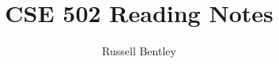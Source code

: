 \documentclass[twocolumn]{aastex631}
\title{CSE 502 Reading Notes}
\author{Russell Bentley}
\begin{document}
\maketitle

\tableofcontents

\twocolumn




\printbibliography
\end{document}
